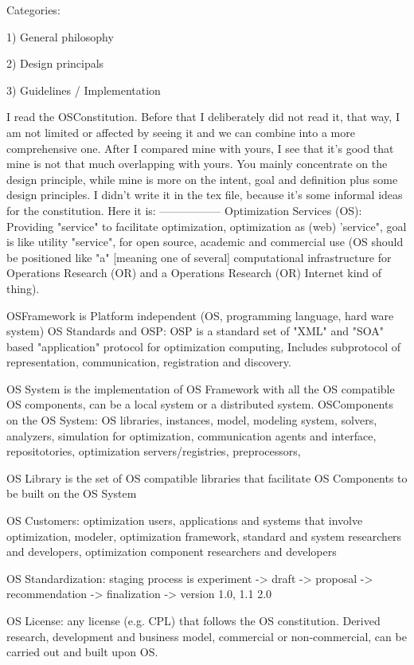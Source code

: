 Categories:

1) General philosophy

2) Design principals 

3) Guidelines / Implementation



I read the OSConstitution.
Before that I deliberately did not read it, that way, I am not limited or affected by seeing it and we can combine into a more comprehensive one.
After I compared mine with yours, I see that it's good that mine is not that much overlapping with yours.
You mainly concentrate on the design principle, while mine is more on the intent, goal and definition plus some design principles.
I didn't write it in the tex file, because it's some informal ideas for the constitution.
Here it is:
-----------------
Optimization Services (OS): Providing "service" to facilitate optimization, optimization as (web) 'service", goal is like utility "service", for open source, academic and commercial use
(OS should be positioned like "a" [meaning one of several] computational infrastructure for Operations Research (OR) and a Operations Research (OR) Internet kind of thing).


OSFramework is Platform independent (OS, programming language, hard ware system)
OS Standards and OSP: OSP is a standard set of "XML" and "SOA" based "application" protocol for optimization computing,
    Includes subprotocol of representation, communication, registration and discovery.

OS System is the implementation of OS Framework with all the OS compatible OS components, can be a local system or a distributed system.
OSComponents on the OS System: OS libraries, instances, model, modeling system, solvers, analyzers, simulation for optimization, communication agents and interface, repositotories, optimization servers/registries, preprocessors,

OS Library is the set of OS compatible libraries that facilitate OS Components to be built on the OS System

OS Customers: optimization users, applications and systems that involve optimization, modeler,  optimization framework, standard and system researchers and developers, optimization component researchers and developers

OS Standardization: staging process is experiment -> draft -> proposal -> recommendation -> finalization -> version 1.0, 1.1 2.0

OS License: any license (e.g. CPL) that follows the OS constitution. Derived research, development and business model, commercial or non-commercial, can be carried out and built upon OS.

